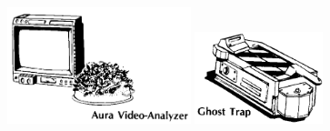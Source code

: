 \begin{frame}[b]
{\begin{center}
\includegraphics[width=0.4\textwidth]{./images/aura-analyseur.png} \hspace{0.5cm}  \includegraphics[width=0.28\textwidth]{./images/ghost-trap.png}\textsl{}
\end{center}



}{%

}
\end{frame}
